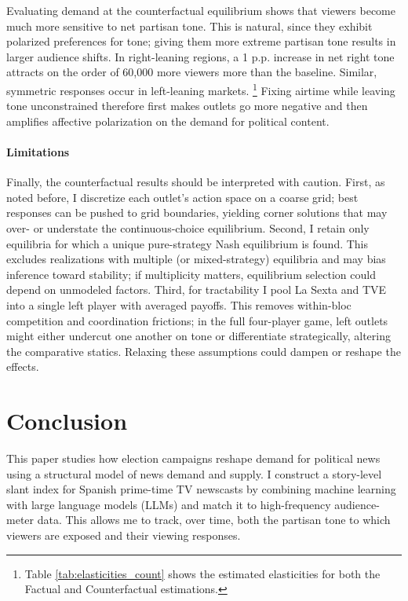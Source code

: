 \documentclass[12pt]{article}
\begin{document}
Evaluating demand at the counterfactual equilibrium shows that viewers become much more sensitive to net partisan tone. This is natural, since they exhibit polarized preferences for tone; giving them more extreme partisan tone results in larger audience shifts. In right-leaning regions, a 1 p.p. increase in net right tone attracts on the order of 60,000 more viewers more than the baseline. Similar, symmetric responses occur in  left-leaning markets.  \footnote{Table \ref{tab:elasticities_count} shows the estimated elasticities for both the Factual and Counterfactual estimations. } Fixing airtime while leaving tone unconstrained therefore first makes outlets go more negative and then amplifies affective polarization on the demand for political content. 



\paragraph{Limitations} Finally, the counterfactual results should be interpreted with caution. First, as noted before, I discretize each outlet’s action space on a coarse grid; best responses can be pushed to grid boundaries, yielding corner solutions that may over- or understate the continuous-choice equilibrium. Second, I retain only equilibria for which a unique pure-strategy Nash equilibrium is found. This excludes realizations with multiple (or mixed-strategy) equilibria and may bias inference toward stability; if multiplicity matters, equilibrium selection could depend on unmodeled factors. Third, for tractability I pool La Sexta and TVE into a single left player with averaged payoffs. This removes within-bloc competition and coordination frictions; in the full four-player game, left outlets might either undercut one another on tone or differentiate strategically, altering the comparative statics. Relaxing these assumptions could dampen or reshape the effects.



	
	\section{Conclusion}
	\label{sec:conclusion}
	

This paper studies how election campaigns reshape demand for political news using a structural model of news demand and supply. I construct a story-level slant index for Spanish prime-time TV newscasts by combining machine learning with large language models (LLMs) and match it to high-frequency audience-meter data. This allows me to track, over time, both the partisan tone to which viewers are exposed and their viewing responses.
\end{document}
